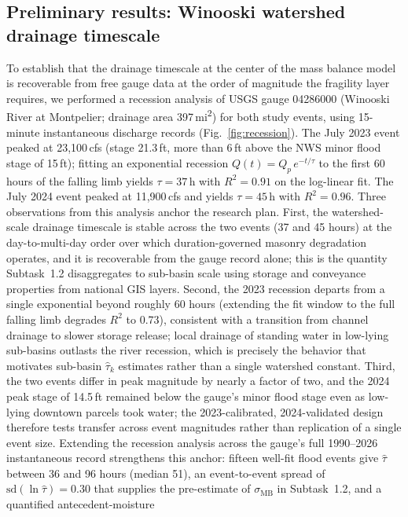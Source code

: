 \documentclass[11pt]{article}
\begin{document}
\subsection{Preliminary results: Winooski watershed drainage timescale}
To establish that the drainage timescale at the center of the mass balance model
is recoverable from free gauge data at the order of magnitude the fragility layer
requires, we performed a recession analysis of USGS gauge 04286000 (Winooski River
at Montpelier; drainage area 397\,mi\textsuperscript{2}) for both study events,
using 15-minute instantaneous discharge records (Fig.~\ref{fig:recession}).
The July 2023 event peaked at 23{,}100\,cfs (stage 21.3\,ft, more than 6\,ft above
the NWS minor flood stage of 15\,ft); fitting an exponential recession
$Q(t) = Q_p\, e^{-t/\tau}$ to the first 60 hours of the falling limb yields
$\tau = 37$\,h with $R^2 = 0.91$ on the log-linear fit.
The July 2024 event peaked at 11{,}900\,cfs and yields $\tau = 45$\,h with
$R^2 = 0.96$.
Three observations from this analysis anchor the research plan.
First, the watershed-scale drainage timescale is stable across the two events
(37 and 45 hours) at the day-to-multi-day order over which duration-governed
masonry degradation operates, and it is recoverable from the gauge record alone;
this is the quantity Subtask~1.2 disaggregates to sub-basin scale using storage
and conveyance properties from national GIS layers.
Second, the 2023 recession departs from a single exponential beyond roughly
60 hours (extending the fit window to the full falling limb degrades $R^2$ to
0.73), consistent with a transition from channel drainage to slower storage
release; local drainage of standing water in low-lying sub-basins outlasts the
river recession, which is precisely the behavior that motivates sub-basin
$\hat{\tau}_k$ estimates rather than a single watershed constant.
Third, the two events differ in peak magnitude by nearly a factor of two, and the
2024 peak stage of 14.5\,ft remained below the gauge's minor flood stage even as
low-lying downtown parcels took water; the 2023-calibrated, 2024-validated design
therefore tests transfer across event magnitudes rather than replication of a
single event size.
Extending the recession analysis across the gauge's full 1990--2026
instantaneous record strengthens this anchor: fifteen well-fit flood events give
$\hat{\tau}$ between 36 and 96 hours (median 51), an event-to-event spread of
$\mathrm{sd}(\ln \hat{\tau}) = 0.30$ that supplies the pre-estimate of
$\sigma_{\mathrm{MB}}$ in Subtask~1.2, and a quantified antecedent-moisture
\end{document}
